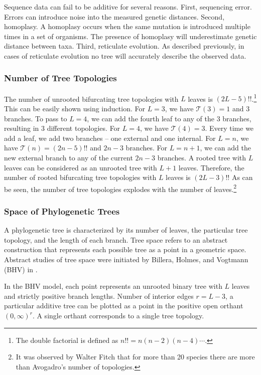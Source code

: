 Sequence data can fail to be additive for several reasons.
First, sequencing error.
Errors can introduce noise into the measured genetic distances.
Second, homoplasy.
A homoplasy occurs when the same mutation is introduced multiple times in a set of organisms.
The presence of homoplasy will underestimate genetic distance between taxa.
Third, reticulate evolution.
As described previously, in cases of reticulate evolution no tree will accurately describe the observed data.

\subsubsection{Number of Tree Topologies}
\label{bg:bio:phylo:topologies}

The number of unrooted bifurcating tree topologies with $L$ leaves is $(2L-5)!!$.\footnote{The double factorial is defined as $n!!=n(n-2)(n-4)\cdots$.}
This can be easily shown using induction.
For $L=3$, we have $\mathcal{T}(3)=1$ and $3$ branches.
To pass to $L=4$, we can add the fourth leaf to any of the $3$ branches, resulting in $3$ different topologies.
For $L=4$, we have $\mathcal{T}(4)=3$.
Every time we add a leaf, we add two branches -- one external and one internal.
For $L=n$, we have $\mathcal{T}(n)=(2n-5)!!$ and $2n-3$ branches.
For $L=n+1$, we can add the new external branch to any of the current $2n-3$ branches.
A rooted tree with $L$ leaves can be considered as an unrooted tree with $L+1$ leaves.
Therefore, the number of rooted bifurcating tree topologies with $L$ leaves is $(2L-3)!!$
As can be seen, the number of tree topologies explodes with the number of leaves.\footnote{It was observed by Walter Fitch that for more than 20 species there are more than Avogadro's number of topologies.}

\subsubsection{Space of Phylogenetic Trees }
\label{bg:bio:phylo:space}

A phylogenetic tree is characterized by its number of leaves, the particular tree topology, and the length of each branch.
Tree space refers to an abstract construction that represents each possible tree as a point in a geometric space.
Abstract studies of tree space were initiated by Billera, Holmes, and Vogtmann (BHV) in \cite{Billera:2001tv}.

In the BHV model, each point represents an unrooted binary tree with $L$ leaves and strictly positive branch lengths.
Number of interior edges $r=L-3$, a particular additive tree can be plotted as a point in the positive open orthant $(0,\infty)^{r}$.
A single orthant corresponds to a single tree topology.

